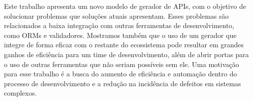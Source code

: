 Este trabalho apresenta um novo modelo de gerador de APIs, com o objetivo de solucionar
problemas que soluções atuais apresentam. Esses problemas são relacionados a baixa
integração com outras ferramentas de desenvolvimento, como ORMs e validadores. Mostramos
também que o uso de um gerador que integre de forma eficaz com o restante do ecossistema
pode resultar em grandes ganhos de eficiência para um time de desenvolvimento, além de
abrir portas para o uso de outras ferramentas que não seriam possíveis sem ele. Uma
motivação para esse trabalho é a busca do aumento de eficiência e automação dentro do
processo de desenvolvimento e a redução na incidência de defeitos em sistemas complexos.
